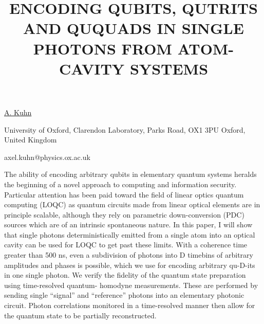 \title{ENCODING QUBITS, QUTRITS AND QUQUADS IN SINGLE PHOTONS FROM ATOM-CAVITY SYSTEMS}

\underline{A. Kuhn}

{\normalsize{\vspace{-4mm}
University of Oxford, Clarendon Laboratory, Parks Road, OX1 3PU Oxford, United Kingdom

\email axel.kuhn@physics.ox.ac.uk}}

The ability of encoding arbitrary qubits in elementary quantum systems heralds the beginning of a novel approach to computing
and information security. Particular attention has been paid toward the field of linear optics quantum computing (LOQC) as
quantum circuits made from linear optical elements are in principle scalable, although they rely on parametric down-conversion
(PDC) sources which are of an intrinsic spontaneous nature. In this paper, I will show that single photons deterministically emitted
from a single atom into an optical cavity can be used for LOQC to get past these limits. With a coherence time greater than 500
ns, even a subdivision of photons into D timebins of arbitrary amplitudes and phases is possible, which we use for encoding
arbitrary qu-D-its in one single photon. We verify the fidelity of the quantum state preparation using time-resolved quantum-
homodyne measurements. These are performed by sending single ``signal'' and ``reference'' photons into an elementary photonic
circuit. Photon correlations monitored in a time-resolved manner then allow for the quantum state to be partially reconstructed.

\vspace{\baselineskip} 